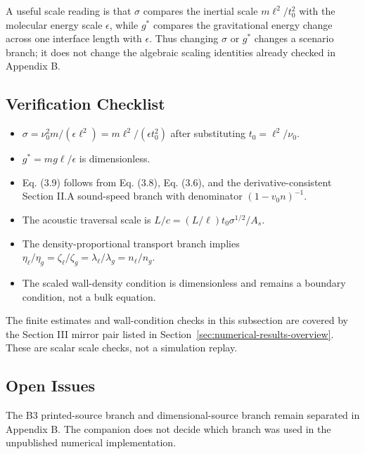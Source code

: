A useful scale reading is that \(\sigma\) compares the inertial scale
\(m\ell^2/t_0^2\) with the molecular energy scale \(\epsilon\), while \(g^*\)
compares the gravitational energy change across one interface length with
\(\epsilon\).  Thus changing \(\sigma\) or \(g^*\) changes a scenario branch; it
does not change the algebraic scaling identities already checked in Appendix B.

\subsection*{Verification Checklist}

\begin{itemize}
\item \(\sigma=\nu_0^2m/(\epsilon\ell^2)=m\ell^2/(\epsilon t_0^2)\) after
  substituting \(t_0=\ell^2/\nu_0\).
\item \(g^*=mg\ell/\epsilon\) is dimensionless.
\item Eq. (3.9) follows from Eq. (3.8), Eq. (3.6), and the
  derivative-consistent Section II.A sound-speed branch with denominator
  \((1-v_0n)^{-1}\).
\item The acoustic traversal scale is
  \(L/c=(L/\ell)t_0\sigma^{1/2}/A_s\).
\item The density-proportional transport branch implies
  \(\eta_\ell/\eta_g=\zeta_\ell/\zeta_g=\lambda_\ell/\lambda_g=n_\ell/n_g\).
\item The scaled wall-density condition is dimensionless and remains a boundary
  condition, not a bulk equation.
\end{itemize}
The finite estimates and wall-condition checks in this subsection are covered
by the Section III mirror pair listed in
Section~\ref{sec:numerical-results-overview}.  These are scalar scale checks,
not a simulation replay.

\subsection*{Open Issues}

The B3 printed-source branch and dimensional-source branch remain separated in
Appendix B.  The companion does not decide which branch was used in the
unpublished numerical implementation.
